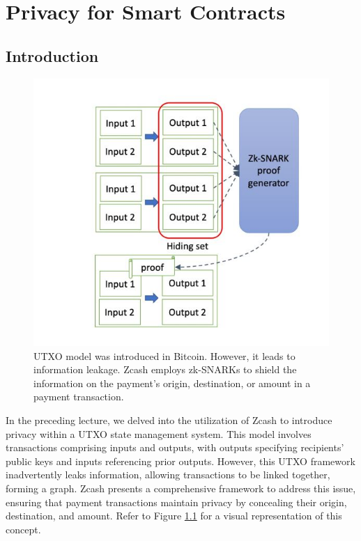 \chapter{Privacy for Smart Contracts}
\section{Introduction}
\begin{center}
	\begin{figure}
		\centering
		\includegraphics[width=0.8\linewidth]{Fig/20/F1}
		\caption{UTXO model was introduced in Bitcoin. However, it leads to information leakage. Zcash employs zk-SNARKs to shield the information on the payment’s origin, destination, or amount in a payment transaction.}
		\label{fig:L20_f1}
	\end{figure}
\end{center}
In the preceding lecture, we delved into the utilization of Zcash to introduce privacy within a UTXO state management system. This model involves transactions comprising inputs and outputs, with outputs specifying recipients' public keys and inputs referencing prior outputs. However, this UTXO framework inadvertently leaks information, allowing transactions to be linked together, forming a graph. Zcash presents a comprehensive framework to address this issue, ensuring that payment transactions maintain privacy by concealing their origin, destination, and amount. Refer to Figure \ref{fig:L20_f1} for a visual representation of this concept.\\
